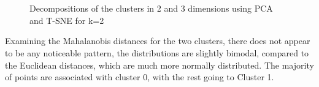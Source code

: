 \begin{figure}[H]
	\centering
	\\
	\\
	\caption{Decompositions of the clusters in 2 and 3 dimensions using PCA and T-SNE for k=2}
	\label{fig:k2pca}
\end{figure}
Examining the Mahalanobis distances for the two clusters, there does not appear to be any noticeable pattern, the distributions are slightly bimodal, compared to the Euclidean distances, which are much more normally distributed. The majority of points are associated with cluster 0, with the rest going to Cluster 1.
